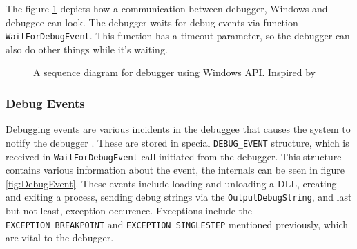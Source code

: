The figure \ref{fig:win32debugger} depicts how a communication between
debugger, Windows and debuggee can look. The debugger waits for debug events via
function \texttt{WaitForDebugEvent}. This function has a timeout
parameter, so the debugger can also do other things while it's waiting.

\begin{figure}
    \centering
    \caption{A sequence diagram for debugger using Windows API. Inspired by
             }
    \label{fig:win32debugger}
\end{figure}
 
\subsubsection*{Debug Events}\label{section:Debug Events}
Debugging events are various incidents in the debuggee that causes the system
to notify the debugger \cite{windows-msdn-debug-events}. These are stored in
special \texttt{DEBUG_EVENT} structure, which is received in
\texttt{WaitForDebugEvent} call initiated from the debugger. This structure
contains various information about the event, the internals can be seen in
figure \ref{fig:DebugEvent}. These events include loading and unloading a DLL,
creating and exiting a process, sending debug strings via the
\texttt{OutputDebugString}, and last but not least, exception occurence.
Exceptions include the \texttt{EXCEPTION\_BREAKPOINT} and
\texttt{EXCEPTION\_SINGLESTEP} mentioned previously, which are vital to the
debugger.

